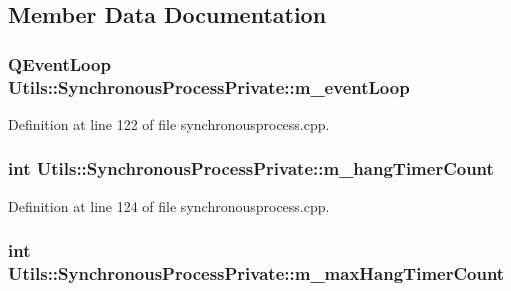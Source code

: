 \subsection{\-Member \-Data \-Documentation}
\hypertarget{struct_utils_1_1_synchronous_process_private_a6180310bc850d467e6de05bb290cbe4d}{
\subsubsection[{m\-\_\-event\-Loop}]{\setlength{\rightskip}{0pt plus 5cm}\-Q\-Event\-Loop {\bf \-Utils\-::\-Synchronous\-Process\-Private\-::m\-\_\-event\-Loop}}}\label{struct_utils_1_1_synchronous_process_private_a6180310bc850d467e6de05bb290cbe4d}


\-Definition at line 122 of file synchronousprocess.\-cpp.

\hypertarget{struct_utils_1_1_synchronous_process_private_ac7de20b273159cc80d6e65fc726667a9}{
\subsubsection[{m\-\_\-hang\-Timer\-Count}]{\setlength{\rightskip}{0pt plus 5cm}int {\bf \-Utils\-::\-Synchronous\-Process\-Private\-::m\-\_\-hang\-Timer\-Count}}}\label{struct_utils_1_1_synchronous_process_private_ac7de20b273159cc80d6e65fc726667a9}


\-Definition at line 124 of file synchronousprocess.\-cpp.

\hypertarget{struct_utils_1_1_synchronous_process_private_a597b1e5e3588256a60e31e098839f985}{
\subsubsection[{m\-\_\-max\-Hang\-Timer\-Count}]{\setlength{\rightskip}{0pt plus 5cm}int {\bf \-Utils\-::\-Synchronous\-Process\-Private\-::m\-\_\-max\-Hang\-Timer\-Count}}}\label{struct_utils_1_1_synchronous_process_private_a597b1e5e3588256a60e31e098839f985}


